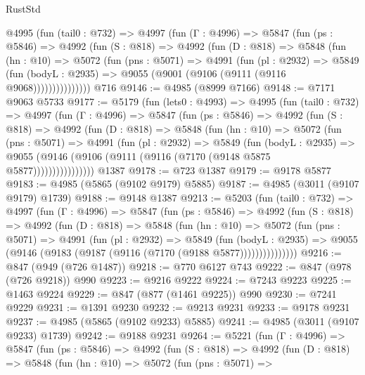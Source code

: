 \begin{lexlean}{RustStd}
\begin{coremodule}
      @4995
        (fun (tail0 : @732) =>
        @4997
          (fun (Γ : @4996) =>
          @5847
            (fun (ps : @5846) =>
            @4992
              (fun (S : @818) =>
              @4992
                (fun (D : @818) =>
                @5848
                  (fun (hn : @10) =>
                  @5072
                    (fun (pns : @5071) =>
                    @4991
                      (fun (pl : @2932) =>
                      @5849
                        (fun (bodyL : @2935) =>
                        @9055 (@9001 (@9106 (@9111 (@9116 @9068)))))))))))))))
    @716
@9146 := @4985 (@8999 @7166)
@9148 := @7171 @9063 @5733
@9177 := @5179
    (fun (lets0 : @4993) =>
    @4995
      (fun (tail0 : @732) =>
      @4997
        (fun (Γ : @4996) =>
        @5847
          (fun (ps : @5846) =>
          @4992
            (fun (S : @818) =>
            @4992
              (fun (D : @818) =>
              @5848
                (fun (hn : @10) =>
                @5072
                  (fun (pns : @5071) =>
                  @4991
                    (fun (pl : @2932) =>
                    @5849
                      (fun (bodyL : @2935) =>
                      @9055 (@9146 (@9106 (@9111 (@9116 (@7170 (@9148 @5875 @5877))))))))))))))))
    @1387
@9178 := @723 @1387
@9179 := @9178 @5877
@9183 := @4985 (@5865 (@9102 @9179) @5885)
@9187 := @4985 (@3011 (@9107 @9179) @1739)
@9188 := @9148 @1387
@9213 := @5203
    (fun (tail0 : @732) =>
    @4997
      (fun (Γ : @4996) =>
      @5847
        (fun (ps : @5846) =>
        @4992
          (fun (S : @818) =>
          @4992
            (fun (D : @818) =>
            @5848
              (fun (hn : @10) =>
              @5072
                (fun (pns : @5071) =>
                @4991
                  (fun (pl : @2932) =>
                  @5849
                    (fun (bodyL : @2935) =>
                    @9055 (@9146 (@9183 (@9187 (@9116 (@7170 (@9188 @5877)))))))))))))))
@9216 := @847 (@949 (@726 @1487))
@9218 := @770 @6127 @743
@9222 := @847 (@978 (@726 @9218)) @990
@9223 := @9216 @9222
@9224 := @7243 @9223
@9225 := @1463 @9224
@9229 := @847 (@877 (@1461 @9225)) @990
@9230 := @7241 @9229
@9231 := @1391 @9230
@9232 := @9213 @9231
@9233 := @9178 @9231
@9237 := @4985 (@5865 (@9102 @9233) @5885)
@9241 := @4985 (@3011 (@9107 @9233) @1739)
@9242 := @9188 @9231
@9264 := @5221
    (fun (Γ : @4996) =>
    @5847
      (fun (ps : @5846) =>
      @4992
        (fun (S : @818) =>
        @4992
          (fun (D : @818) =>
          @5848
            (fun (hn : @10) =>
            @5072
              (fun (pns : @5071) =>

\end{coremodule}
\end{lexlean}
